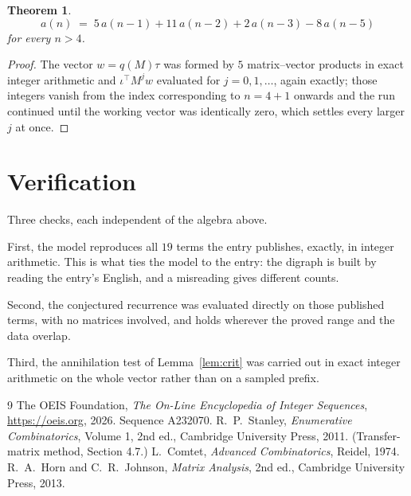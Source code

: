 \documentclass[11pt,a4paper]{article}
\theoremstyle{plain}
\newtheorem{theorem}{Theorem}
\theoremstyle{definition}
\begin{document}
\begin{theorem}
\[
a(n)\;=\;5\,a(n-1) + 11\,a(n-2) + 2\,a(n-3) - 8\,a(n-5)
\]
for every $n>4$.
\end{theorem}

\begin{proof}
The vector $w=q(M)\tau$ was formed by $5$ matrix--vector products in exact integer
arithmetic and $\iota^{\!\top}M^{j}w$ evaluated for $j=0,1,\dots$, again exactly; those
integers vanish from the index corresponding to $n=4+1$ onwards and the run continued
until the working vector was identically zero, which settles every larger $j$ at once.
\end{proof}

\section{Verification}

Three checks, each independent of the algebra above.

First, the model reproduces all $19$ terms the entry publishes, exactly, in integer
arithmetic. This is what ties the model to the entry: the digraph is built by reading the
entry's English, and a misreading gives different counts.

Second, the conjectured recurrence was evaluated directly on those published terms, with no
matrices involved, and holds wherever the proved range and the data overlap.

Third, the annihilation test of Lemma~\ref{lem:crit} was carried out in exact integer
arithmetic on the whole vector rather than on a sampled prefix.

\begin{thebibliography}{9}
 The OEIS Foundation, \emph{The On-Line Encyclopedia of Integer
Sequences}, \url{https://oeis.org}, 2026. Sequence A232070.
 R.~P.~Stanley, \emph{Enumerative Combinatorics}, Volume 1, 2nd ed.,
Cambridge University Press, 2011. (Transfer-matrix method, Section 4.7.)
 L.~Comtet, \emph{Advanced Combinatorics}, Reidel, 1974.
 R.~A.~Horn and C.~R.~Johnson, \emph{Matrix Analysis}, 2nd ed., Cambridge
University Press, 2013.
\end{thebibliography}
\end{document}
